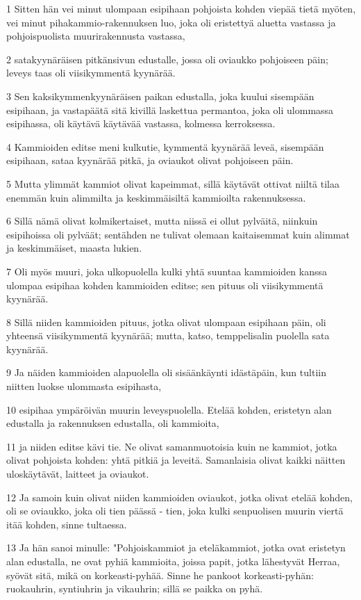 \par 1 Sitten hän vei minut ulompaan esipihaan pohjoista kohden viepää tietä myöten, vei minut pihakammio-rakennuksen luo, joka oli eristettyä aluetta vastassa ja pohjoispuolista muurirakennusta vastassa,
\par 2 satakyynäräisen pitkänsivun edustalle, jossa oli oviaukko pohjoiseen päin; leveys taas oli viisikymmentä kyynärää.
\par 3 Sen kaksikymmenkyynäräisen paikan edustalla, joka kuului sisempään esipihaan, ja vastapäätä sitä kivillä laskettua permantoa, joka oli ulommassa esipihassa, oli käytävä käytävää vastassa, kolmessa kerroksessa.
\par 4 Kammioiden editse meni kulkutie, kymmentä kyynärää leveä, sisempään esipihaan, sataa kyynärää pitkä, ja oviaukot olivat pohjoiseen päin.
\par 5 Mutta ylimmät kammiot olivat kapeimmat, sillä käytävät ottivat niiltä tilaa enemmän kuin alimmilta ja keskimmäisiltä kammioilta rakennuksessa.
\par 6 Sillä nämä olivat kolmikertaiset, mutta niissä ei ollut pylväitä, niinkuin esipihoissa oli pylväät; sentähden ne tulivat olemaan kaitaisemmat kuin alimmat ja keskimmäiset, maasta lukien.
\par 7 Oli myös muuri, joka ulkopuolella kulki yhtä suuntaa kammioiden kanssa ulompaa esipihaa kohden kammioiden editse; sen pituus oli viisikymmentä kyynärää.
\par 8 Sillä niiden kammioiden pituus, jotka olivat ulompaan esipihaan päin, oli yhteensä viisikymmentä kyynärää; mutta, katso, temppelisalin puolella sata kyynärää.
\par 9 Ja näiden kammioiden alapuolella oli sisäänkäynti idästäpäin, kun tultiin niitten luokse ulommasta esipihasta,
\par 10 esipihaa ympäröivän muurin leveyspuolella. Etelää kohden, eristetyn alan edustalla ja rakennuksen edustalla, oli kammioita,
\par 11 ja niiden editse kävi tie. Ne olivat samanmuotoisia kuin ne kammiot, jotka olivat pohjoista kohden: yhtä pitkiä ja leveitä. Samanlaisia olivat kaikki näitten uloskäytävät, laitteet ja oviaukot.
\par 12 Ja samoin kuin olivat niiden kammioiden oviaukot, jotka olivat etelää kohden, oli se oviaukko, joka oli tien päässä - tien, joka kulki senpuolisen muurin viertä itää kohden, sinne tultaessa.
\par 13 Ja hän sanoi minulle: "Pohjoiskammiot ja eteläkammiot, jotka ovat eristetyn alan edustalla, ne ovat pyhiä kammioita, joissa papit, jotka lähestyvät Herraa, syövät sitä, mikä on korkeasti-pyhää. Sinne he pankoot korkeasti-pyhän: ruokauhrin, syntiuhrin ja vikauhrin; sillä se paikka on pyhä.
